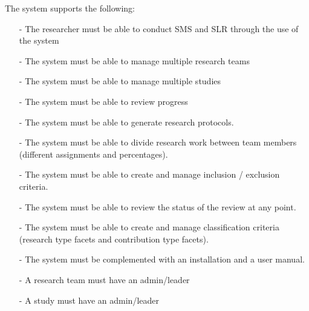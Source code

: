 The system supports the following:
\begin{itemize}
\item[-] The researcher must be able to conduct SMS and SLR through the use of the system
\item[-] The system must be able to manage multiple research teams
\item[-] The system must be able to manage multiple studies
\item[-] The system must be able to review progress
\item[-] The system must be able to generate research protocols.
\item[-] The system must be able to divide research work between team members (different assignments and percentages).
\item[-] The system must be able to create and manage inclusion / exclusion criteria.
\item[-] The system must be able to review the status of the review at any point.
\item[-] The system must be able to create and manage classification criteria (research type facets and contribution type facets).
\item[-] The system must be complemented with an installation and a user manual.
\item[-] A research team must have an admin/leader
\item[-] A study must have an admin/leader

\end{itemize}

%
%
